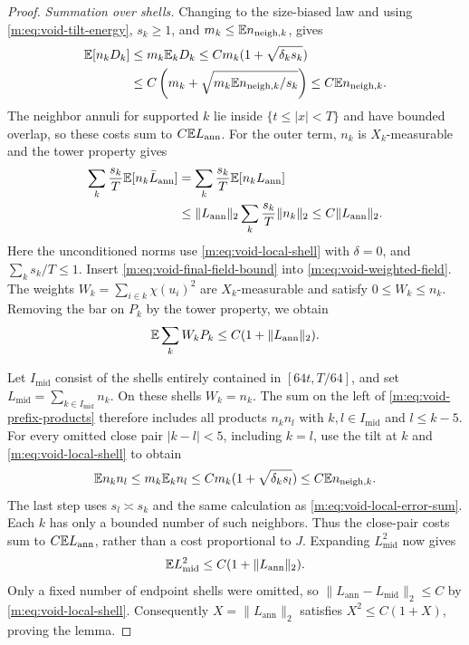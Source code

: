 \begin{proof}
\medskip\noindent
\emph{Summation over shells.}
Changing to the size-biased law and using
\eqref{m:eq:void-tilt-energy}, $s_k\ge1$, and
$m_k\le\mathbb E n_{\mathrm{neigh},k}$, gives
\begin{align}
 \mathbb E[n_kD_k]&\le m_k\mathbb E_kD_k
 \le C m_k(1+\sqrt{\delta_k s_k})\notag\\
 &\le C\left(m_k+
       \sqrt{m_k\mathbb E n_{\mathrm{neigh},k}/s_k}\right)
 \le C\mathbb E n_{\mathrm{neigh},k}.
 \label{m:eq:void-local-error-sum}
\end{align}
The neighbor annuli for supported $k$ lie inside $\{t\le|x|<T\}$ and
have bounded overlap, so these costs sum to $C\mathbb E L_{\mathrm{ann}}$.
For the outer term, $n_k$ is $X_k$-measurable and the tower property gives
\begin{align*}
 \sum_k\frac{s_k}{T}\mathbb E[n_k\bar L_{\mathrm{ann}}]
 &=\sum_k\frac{s_k}{T}\mathbb E[n_kL_{\mathrm{ann}}]\\
 &\le\|L_{\mathrm{ann}}\|_2
       \sum_k\frac{s_k}{T}\|n_k\|_2
 \le C\|L_{\mathrm{ann}}\|_2.
\end{align*}
Here the unconditioned norms use \eqref{m:eq:void-local-shell} with
$\delta=0$, and $\sum_k s_k/T\le1$.
Insert \eqref{m:eq:void-final-field-bound} into
\eqref{m:eq:void-weighted-field}.  The weights
$W_k=\sum_{i\in k}\chi(u_i)^2$ are $X_k$-measurable and satisfy
$0\le W_k\le n_k$.  Removing the bar on $P_k$ by the tower property,
we obtain
\begin{equation}\label{m:eq:void-prefix-products}
 \mathbb E\sum_kW_kP_k\le C(1+\|L_{\mathrm{ann}}\|_2).
\end{equation}

Let $I_{\mathrm{mid}}$ consist of the shells entirely contained in
$[64t,T/64]$, and set $L_{\mathrm{mid}}=\sum_{k\in I_{\mathrm{mid}}}n_k$.
On these shells $W_k=n_k$.  The sum on the left of
\eqref{m:eq:void-prefix-products} therefore includes all products
$n_kn_l$ with $k,l\in I_{\mathrm{mid}}$ and $l\le k-5$.
For every omitted close pair $|k-l|<5$, including $k=l$, use the tilt at
$k$ and \eqref{m:eq:void-local-shell} to obtain
\[
 \mathbb E n_kn_l\le m_k\mathbb E_kn_l
 \le C m_k(1+\sqrt{\delta_k s_l})
 \le C\mathbb E n_{\mathrm{neigh},k}.
\]
The last step uses $s_l\asymp s_k$ and the same calculation as
\eqref{m:eq:void-local-error-sum}.  Each $k$ has only a bounded number of
such neighbors.  Thus the close-pair costs sum to
$C\mathbb E L_{\mathrm{ann}}$, rather than a cost proportional to $J$.
Expanding $L_{\mathrm{mid}}^2$ now gives
\[
 \mathbb E L_{\mathrm{mid}}^2\le C(1+\|L_{\mathrm{ann}}\|_2).
\]
Only a fixed number of endpoint shells were omitted, so
$\|L_{\mathrm{ann}}-L_{\mathrm{mid}}\|_2\le C$ by
\eqref{m:eq:void-local-shell}.  Consequently
$X=\|L_{\mathrm{ann}}\|_2$ satisfies $X^2\le C(1+X)$, proving the lemma.
\end{proof}


